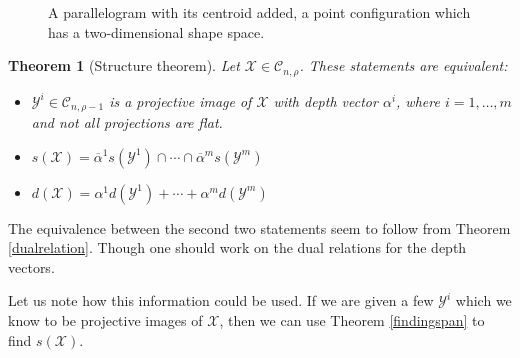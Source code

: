 \documentclass[a4paper,12pt]{book}
\theoremstyle{plain}
\newtheorem{thm}[equation]{Theorem}
\theoremstyle{definition}
\begin{document}
\begin{figure}
\begin{center}
\end{center}
\caption{A parallelogram with its centroid added, a point configuration 
which has a
two-dimensional shape space.}
\end{figure}



\begin{thm}[Structure theorem]
	Let \( \mathcal{X} \in \mathcal{C}_{n,\rho} \). These statements are equivalent:
	\begin{itemize}
		\item \( \mathcal{Y}^i \in \mathcal{C}_{n,\rho-1} \) is a projective image of
			\( \mathcal{X} \) with depth vector
			\( \alpha^i \),	where \( i = 1, \ldots, m \) and not all projections are flat.
		\item \( s(\mathcal{X} ) = \overline{\alpha}^1 s(\mathcal{Y}^1 ) \cap \cdots \cap
			\overline{\alpha}^m s(\mathcal{Y}^m ) \)
		\item \( d(\mathcal{X} ) = \alpha^1 d(\mathcal{Y}^1 ) + \cdots +
			\alpha^m d(\mathcal{Y}^m )\)
	\end{itemize}
\end{thm}

The equivalence between the second two statements seem to follow from Theorem \ref{dualrelation}.
Though one should work on the dual relations for the depth vectors.

Let us note how this information could be used.
If we are given a few \( \mathcal{Y}^i \)
which we know to be projective images of \( \mathcal{X} \),
then we can use Theorem \ref{findingspan} to find \( s(\mathcal{X} ) \).
\end{document}

